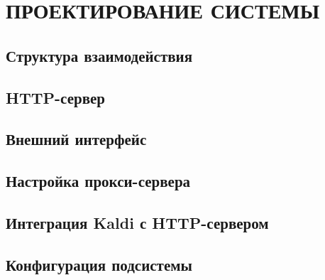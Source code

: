 \chapter{ПРОЕКТИРОВАНИЕ СИСТЕМЫ}

\section{Структура взаимодействия}
\section{HTTP-сервер}
\section{Внешний интерфейс}
\section{Настройка прокси-сервера}
\section{Интеграция Kaldi с HTTP-сервером}
\section{Конфигурация подсистемы}
